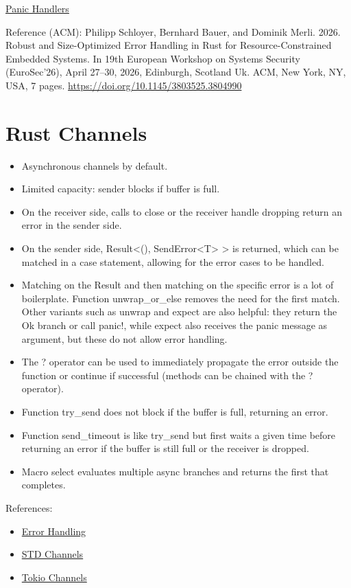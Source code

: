 \documentclass[a4paper,11pt]{article}
\theoremstyle{plain}
\theoremstyle{nonumberplain}
\begin{document}
\href{https://docs.rust-embedded.org/book/start/panicking.html}{Panic Handlers}

Reference (ACM): Philipp Schloyer, Bernhard Bauer, and Dominik Merli. 2026. Robust and Size-Optimized Error Handling in Rust for Resource-Constrained Embedded Systems. In 19th European Workshop on Systems Security (EuroSec'26), April 27--30, 2026, Edinburgh, Scotland Uk. ACM, New York, NY, USA, 7 pages. \href{https://doi.org/10.1145/3803525.3804990}{https://doi.org/10.1145/3803525.3804990}

\section{Rust Channels}

\begin{itemize}
  \item Asynchronous channels by default.
  \item Limited capacity: sender blocks if buffer is full.
  \item On the receiver side, calls to close or the receiver handle dropping return an error in the sender side.
  \item On the sender side, Result<(), SendError<T> > is returned, which can be matched in a case statement, allowing for the error cases to be handled.
  \item Matching on the Result and then matching on the specific error is a lot of boilerplate. Function unwrap\_or\_else removes the need for the first match. Other variants such as unwrap and expect are also helpful: they return the Ok branch or call panic!, while expect also receives the panic message as argument, but these do not allow error handling.
  \item The ? operator can be used to immediately propagate the error outside the function or continue if successful (methods can be chained with the ? operator).
  \item Function try\_send does not block if the buffer is full, returning an error.
  \item Function send\_timeout is like try\_send but first waits a given time before returning an error if the buffer is still full or the receiver is dropped.
  \item Macro select evaluates multiple async branches and returns the first that completes.
\end{itemize}

References:

\begin{itemize}
  \item \href{https://doc.rust-lang.org/book/ch09-00-error-handling.html}{Error Handling}
  \item \href{https://doc.rust-lang.org/rust-by-example/std_misc/channels.html}{STD Channels}
  \item \href{https://docs.rs/tokio/1.53.2/tokio/sync/mpsc/struct.Sender.html#method.closed}{Tokio Channels}
\end{itemize}
\end{document}
